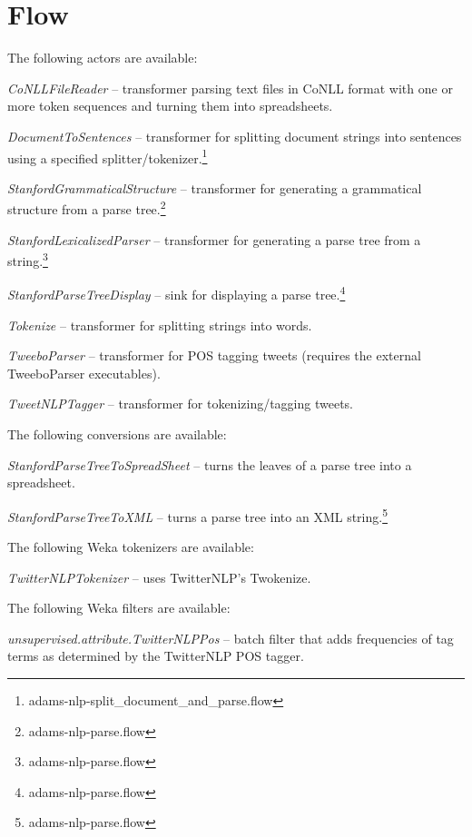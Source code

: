 \documentclass[a4paper]{book}
\begin{document}
\chapter{Flow}
The following actors are available:
\begin{tight_itemize}
	\item \textit{CoNLLFileReader} -- transformer parsing text files in
	CoNLL format with one or more token sequences and turning them into
	spreadsheets.
	\item \textit{DocumentToSentences} -- transformer for splitting document
	strings into sentences using a specified
	splitter/tokenizer.\footnote{adams-nlp-split\_document\_and\_parse.flow}
	\item \textit{StanfordGrammaticalStructure} -- transformer for generating a 
	grammatical structure from a parse tree.\footnote{adams-nlp-parse.flow}
	\item \textit{StanfordLexicalizedParser} -- transformer for generating a 
	parse tree from a string.\footnote{adams-nlp-parse.flow}
	\item \textit{StanfordParseTreeDisplay} -- sink for displaying a parse 
	tree.\footnote{adams-nlp-parse.flow}
	\item \textit{Tokenize} -- transformer for splitting strings
	into words.
	\item \textit{TweeboParser} -- transformer for POS tagging tweets
	(requires the external TweeboParser executables).
	\item \textit{TweetNLPTagger} -- transformer for tokenizing/tagging
	tweets.
\end{tight_itemize}
The following conversions are available:
\begin{tight_itemize}
   	\item \textit{StanfordParseTreeToSpreadSheet} -- turns the leaves of a
   	parse tree into a spreadsheet.
	\item \textit{StanfordParseTreeToXML} -- turns a parse tree into an
	XML string.\footnote{adams-nlp-parse.flow}
\end{tight_itemize}
The following Weka tokenizers are available:
\begin{tight_itemize}
	\item \textit{TwitterNLPTokenizer} -- uses TwitterNLP's Twokenize.
\end{tight_itemize}
The following Weka filters are available:
\begin{tight_itemize}
	\item \textit{unsupervised.attribute.TwitterNLPPos} -- batch filter
	that adds frequencies of tag terms as determined by the TwitterNLP
	POS tagger.
\end{tight_itemize}


\end{document}
